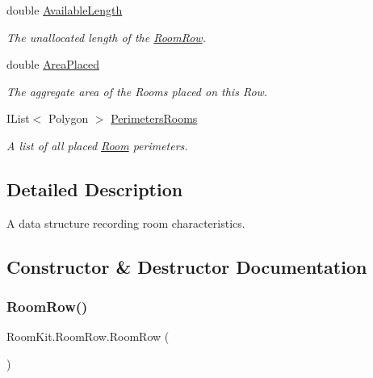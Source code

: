 \begin{DoxyCompactItemize}
double \mbox{\hyperlink{class_room_kit_1_1_room_row_a641180f7b37e1cb23b47b2a47441f6ea}{Available\+Length}}
\begin{DoxyCompactList}\small\item\em The unallocated length of the \mbox{\hyperlink{class_room_kit_1_1_room_row}{Room\+Row}}. \end{DoxyCompactList}\item 
double \mbox{\hyperlink{class_room_kit_1_1_room_row_a2ee541d26536306906eeb29953e496ed}{Area\+Placed}}
\begin{DoxyCompactList}\small\item\em The aggregate area of the Rooms placed on this Row. \end{DoxyCompactList}\item 
I\+List$<$ Polygon $>$ \mbox{\hyperlink{class_room_kit_1_1_room_row_a57619fed2ddba58b0ece1c1d17040d48}{Perimeters\+Rooms}}
\begin{DoxyCompactList}\small\item\em A list of all placed \mbox{\hyperlink{class_room_kit_1_1_room}{Room}} perimeters. \end{DoxyCompactList}\end{DoxyCompactItemize}


\subsection{Detailed Description}
A data structure recording room characteristics. 



\subsection{Constructor \& Destructor Documentation}
\mbox{\label{class_room_kit_1_1_room_row_addd348f8431a2c6281b9be1b40373594}} 
\subsubsection{\texorpdfstring{Room\+Row()}{RoomRow()}\hspace{0.1cm}{\footnotesize\ttfamily [1/2]}}
{\footnotesize\ttfamily Room\+Kit.\+Room\+Row.\+Room\+Row (\begin{DoxyParamCaption}{ }\end{DoxyParamCaption})}



